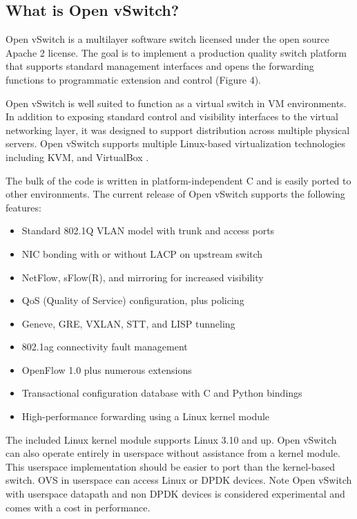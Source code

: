 \documentclass[../sn.tex]{subfiles}
\begin{document}
\subsection{What is Open vSwitch?}
Open vSwitch is a multilayer software switch licensed under the open source 
Apache 2 license. The goal is to implement a production quality switch platform 
that supports standard management interfaces and opens the forwarding functions 
to programmatic extension and control (Figure 4).

Open vSwitch is well suited to function as a virtual switch in VM environments. 
In addition to exposing standard control and visibility interfaces to the virtual 
networking layer, it was designed to support distribution across multiple physical 
servers. Open vSwitch supports multiple Linux-based virtualization technologies 
including KVM, and VirtualBox \cite{ovs}.

The bulk of the code is written in platform-independent C and is easily ported to 
other environments. The current release of Open vSwitch supports the following features:
\begin{itemize}
    \item Standard 802.1Q VLAN model with trunk and access ports
    \item NIC bonding with or without LACP on upstream switch
    \item NetFlow, sFlow(R), and mirroring for increased visibility
    \item QoS (Quality of Service) configuration, plus policing
    \item Geneve, GRE, VXLAN, STT, and LISP tunneling
    \item 802.1ag connectivity fault management
    \item OpenFlow 1.0 plus numerous extensions
    \item Transactional configuration database with C and Python bindings
    \item High-performance forwarding using a Linux kernel module
\end{itemize} The included Linux kernel module supports Linux 3.10 and up.
Open vSwitch can also operate entirely in userspace without assistance from a kernel
module. This userspace implementation should be easier to port than the kernel-based 
switch. OVS in userspace can access Linux or DPDK devices. Note Open vSwitch with 
userspace datapath and non DPDK devices is considered experimental and comes with a 
cost in performance.
\end{document}
